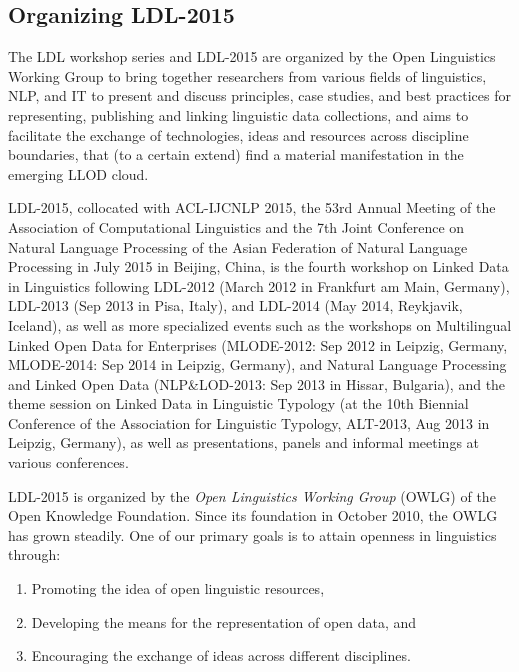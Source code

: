 \subsection{Organizing LDL-2015}

The LDL workshop series and LDL-2015 are organized by the Open Linguistics Working Group 
to bring together researchers from various fields of linguistics, NLP, and IT to present and discuss principles, case studies, and best practices for representing, publishing and linking linguistic data collections, and aims to facilitate the exchange of technologies, ideas and resources across discipline boundaries, that (to a certain extend) find a material manifestation in the emerging LLOD cloud.

LDL-2015, collocated with ACL-IJCNLP 2015, the 53rd Annual Meeting of the Association of Computational Linguistics and the 7th Joint Conference on Natural Language Processing of the Asian Federation of Natural Language Processing in July 2015 in Beijing, China, is the fourth workshop on Linked Data in Linguistics following LDL-2012 (March 2012 in Frankfurt am Main, Germany), LDL-2013 (Sep 2013 in Pisa, Italy),
and LDL-2014 (May 2014, Reykjavik, Iceland), as well as more specialized events such as the workshops on Multilingual Linked Open Data for Enterprises (MLODE-2012: Sep 2012 in Leipzig, Germany, MLODE-2014: Sep 2014 in Leipzig, Germany), and Natural Language Processing and Linked Open Data (NLP\&LOD-2013: Sep 2013 in Hissar, Bulgaria), and the theme session on Linked Data in Linguistic Typology (at the 10th Biennial Conference of the Association for Linguistic Typology, ALT-2013, Aug 2013 in Leipzig, Germany), as well as presentations, panels and informal meetings at various conferences.

LDL-2015 is organized by the \emph{Open Linguistics Working Group} (OWLG) of the Open Knowledge Foundation. Since its foundation in October 2010, the OWLG has grown steadily. One of our primary goals is to attain openness in linguistics through:

\begin{enumerate}
\item Promoting the idea of open linguistic resources,
\item Developing the means for the representation of open data, and
\item Encouraging the exchange of ideas across different disciplines.
\end{enumerate}

